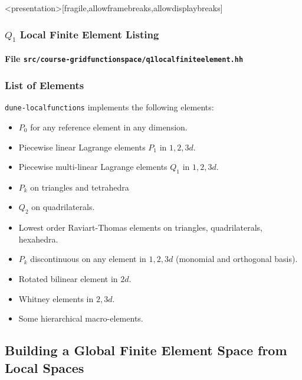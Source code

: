 \begin{frame}<presentation>[fragile,allowframebreaks,allowdisplaybreaks]
\frametitle<presentation>{$Q_1$ Local Finite Element Listing}
\framesubtitle<presentation>{File \texttt{src/course-gridfunctionspace/q1localfiniteelement.hh}}

\end{frame}

\begin{frame}
\frametitle{List of Elements}
\lstinline{dune-localfunctions} implements the
following elements:
\begin{itemize}
\item $P_0$ for any reference element in any dimension. 
\item Piecewise linear Lagrange elements $P_1$ in $1, 2, 3d$.
\item Piecewise multi-linear Lagrange elements $Q_1$ in $1, 2, 3d$.
\item $P_k$ on triangles and tetrahedra
\item $Q_2$ on quadrilaterals.
\item Lowest order Raviart-Thomas elements on triangles, quadrilaterals, hexahedra.
\item $P_k$ discontinuous on any element in $1, 2, 3d$ (monomial and orthogonal basis).
\item Rotated bilinear element in $2d$.
\item Whitney elements in $2, 3d$.
\item Some hierarchical macro-elements.
\end{itemize}
\end{frame}

\subsection{Building a Global Finite Element Space from Local Spaces}


